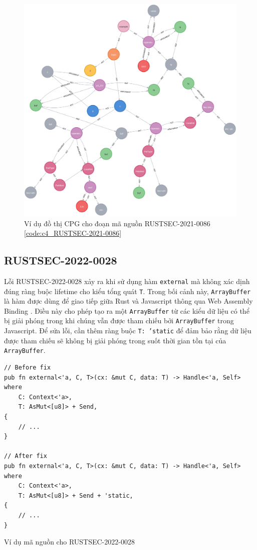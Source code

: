 \begin{figure}[H]
    \includegraphics[width=1\columnwidth]{figures/c4/c4_RUSTSEC-2021-0086}
    \centering
    \caption{Ví dụ đồ thị CPG cho đoạn mã nguồn RUSTSEC-2021-0086 \ref{code:c4_RUSTSEC-2021-0086}}
    \label{img:c4_RUSTSEC-2021-0086}
\end{figure}

\subsection{RUSTSEC-2022-0028}

Lỗi RUSTSEC-2022-0028 xảy ra khi sử dụng hàm \texttt{external} mà không xác dịnh đúng ràng buộc lifetime cho kiểu tổng quát \texttt{T}.
Trong bối cảnh này, \texttt{ArrayBuffer} là hàm được dùng để giao tiếp giữa Rust và Javascript thông qua Web Assembly Binding \cite{ githubGitHubRustwasmwasmbindgen}.
Điều này cho phép tạo ra một \texttt{ArrayBuffer} từ các kiểu dữ liệu có thể bị giải phóng trong khi chúng vẫn được tham chiếu bởi \texttt{ArrayBuffer} trong Javascript.
Để sửa lỗi, cần thêm ràng buộc \texttt{T: 'static} để đảm bảo rằng dữ liệu được tham chiếu sẽ không bị giải phóng trong suốt thời gian tồn tại của \texttt{ArrayBuffer}.

\begin{listing}[H]
\begin{verbatim}
// Before fix
pub fn external<'a, C, T>(cx: &mut C, data: T) -> Handle<'a, Self>
where
    C: Context<'a>,
    T: AsMut<[u8]> + Send,
{
    // ...
}

// After fix
pub fn external<'a, C, T>(cx: &mut C, data: T) -> Handle<'a, Self>
where
    C: Context<'a>,
    T: AsMut<[u8]> + Send + 'static,
{
    // ...
}
\end{verbatim}
\caption{Ví dụ mã nguồn cho RUSTSEC-2022-0028}
\label{code:c4_RUSTSEC-2022-0028}
\end{listing}


